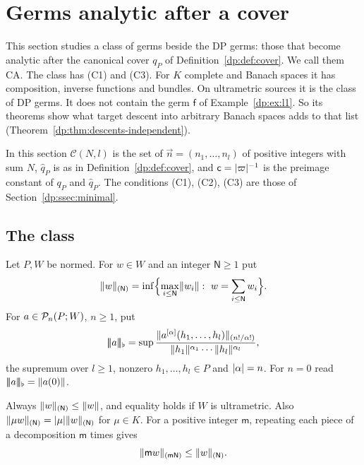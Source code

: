 \section{Germs analytic after a cover}\label{dp:sec:cover}

This section studies a class of germs beside the DP germs: those that become analytic after the canonical cover $q_P$ of Definition~\ref{dp:def:cover}. We call them CA. The class has (C1) and (C3). For $K$ complete and Banach spaces it has composition, inverse functions and bundles. On ultrametric sources it is the class of DP germs. It does not contain the germ $\mathsf f$ of Example~\ref{dp:ex:l1}. So its theorems show what target descent into arbitrary Banach spaces adds to that list (Theorem~\ref{dp:thm:descents-independent}).

In this section $\mathcal C(N,l)$ is the set of $\vec n=(n_1,\dots,n_l)$ of positive integers with sum $N$, $\hat q_P$ is as in Definition~\ref{dp:def:cover}, and $\mathsf c=\lvert \varpi\rvert^{-1}$ is the preimage constant of $q_P$ and $\hat q_P$. The conditions (C1), (C2), (C3) are those of Section~\ref{dp:ssec:minimal}.

\subsection{The class}\label{dp:ssec:ca-class}

\begin{definition}\label{dp:def:flat}
Let $P,W$ be normed. For $w\in W$ and an integer $\mathsf N\ge1$ put
\[
 \lVert w\rVert_{(\mathsf N)}=\inf\Bigl\{\max_{i\le\mathsf N}\lVert w_i\rVert:\ w=\sum_{i\le\mathsf N}w_i\Bigr\}.
\]
For $a\in\mathcal P_n(P;W)$, $n\ge1$, put
\[
 \lvert\!\lvert\!\lvert a\rvert\!\rvert\!\rvert_\flat=\sup\frac{\lVert a^{[\alpha]}(h_1,\dots,h_l)\rVert_{(n!/\alpha!)}}{\lVert h_1\rVert^{\alpha_1}\cdots\lVert h_l\rVert^{\alpha_l}},
\]
the supremum over $l\ge1$, nonzero $h_1,\dots,h_l\in P$ and $\lvert \alpha\rvert=n$. For $n=0$ read $\lvert\!\lvert\!\lvert a\rvert\!\rvert\!\rvert_\flat=\lVert a(0)\rVert$.
\end{definition}

Always $\lVert w\rVert_{(\mathsf N)}\le\lVert w\rVert$, and equality holds if $W$ is ultrametric. Also $\lVert \mu w\rVert_{(\mathsf N)}=\lvert \mu\rvert\lVert w\rVert_{(\mathsf N)}$ for $\mu\in K$. For a positive integer $\mathsf m$, repeating each piece of a decomposition $\mathsf m$ times gives
\begin{equation}\label{dp:eq:ca-repeat}
 \lVert \mathsf m w\rVert_{(\mathsf m\mathsf N)}\le\lVert w\rVert_{(\mathsf N)}.
\end{equation}

